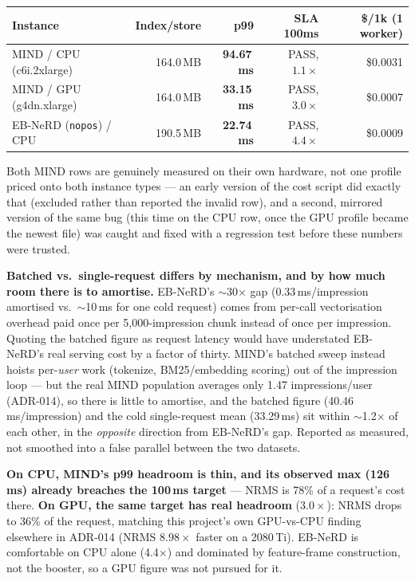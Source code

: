 \documentclass[11pt]{article}
\begin{document}
\begin{center}
{\footnotesize
\begin{tabular}{@{}lrrrr@{}}
\toprule
Instance & Index/store & p99 & SLA 100ms & \$/1k (1 worker) \\
\midrule
MIND / CPU (c6i.2xlarge) & 164.0\,MB & \textbf{94.67\,ms} & PASS, $1.1\times$ & \$0.0031 \\
MIND / GPU (g4dn.xlarge) & 164.0\,MB & \textbf{33.15\,ms} & PASS, $3.0\times$ & \$0.0007 \\
EB-NeRD (\texttt{nopos}) / CPU & 190.5\,MB & \textbf{22.74\,ms} & PASS, $4.4\times$ & \$0.0009 \\
\bottomrule
\end{tabular}\par}
\end{center}

Both MIND rows are genuinely measured on their own hardware, not one profile
priced onto both instance types --- an early version of the cost script did
exactly that (excluded rather than reported the invalid row), and a second,
mirrored version of the same bug (this time on the CPU row, once the GPU
profile became the newest file) was caught and fixed with a regression test
before these numbers were trusted.

\textbf{Batched vs.\ single-request differs by mechanism, and by how much room
there is to amortise.} EB-NeRD's $\sim$30$\times$ gap (0.33\,ms/impression
amortised vs.\ $\sim$10\,ms for one cold request) comes from per-call
vectorisation overhead paid once per 5{,}000-impression chunk instead of once
per impression. Quoting the batched figure as request latency would have
understated EB-NeRD's real serving cost by a factor of thirty. MIND's batched
sweep instead hoists per-\emph{user} work (tokenize, BM25/embedding scoring)
out of the impression loop --- but the real MIND population averages only
1.47 impressions/user (ADR-014), so there is little to amortise, and the
batched figure (40.46\,ms/impression) and the cold single-request mean
(33.29\,ms) sit within $\sim$1.2$\times$ of each other, in the \emph{opposite}
direction from EB-NeRD's gap. Reported as measured, not smoothed into a false
parallel between the two datasets.

\textbf{On CPU, MIND's p99 headroom is thin, and its observed max (126\,ms)
already breaches the 100\,ms target} --- NRMS is 78\% of a request's cost there.
\textbf{On GPU, the same target has real headroom} ($3.0\times$): NRMS drops to
36\% of the request, matching this project's own GPU-vs-CPU finding elsewhere
in ADR-014 (NRMS $8.98\times$ faster on a 2080\,Ti). EB-NeRD is comfortable on
CPU alone (4.4$\times$) and dominated by feature-frame construction, not the
booster, so a GPU figure was not pursued for it.
\end{document}
